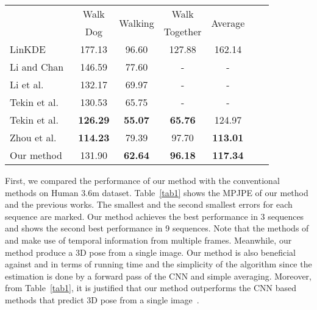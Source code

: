 \documentclass[runningheads]{llncs}
\begin{document}
\begin{table}[t]
\begin{tabular}{ l c c c c c c }
  \multirow{2}{*}{\quad} & Walk & \multirow{2}{*}{Walking} & Walk & \multirow{2}{*}{Average} \\
  & Dog & & Together & \\ \hline
  LinKDE~\cite{h36m_pami}\quad & 177.13 & 96.60 & 127.88 & 162.14 \\
  Li and Chan~\cite{li20143d}\quad & 146.59 & 77.60 & - & - \\
  Li et al.~\cite{li2015maximum}\quad & 132.17 & 69.97 & - & - \\
  Tekin et al.~\cite{tekin2016structured}\quad & 130.53 & 65.75 & - & - \\
  Tekin et al.~\cite{Tekin_2016_CVPR}\quad & \bf 126.29 & \bf 55.07 & \bf 65.76 & 124.97 \\
  Zhou et al.~\cite{Zhou_2016_CVPR}\quad & \bf 114.23 & 79.39 & 97.70 & \bf 113.01 \\
  Our method\quad & 131.90 & \bf 62.64 & \bf 96.18 & \bf 117.34 \\ \hline

\end{tabular}
\end{table}

First, we compared the performance of our method with the conventional methods on Human 3.6m dataset. Table~\ref{tab1} shows the MPJPE of our method and the previous works. The smallest and the second smallest errors for each sequence are marked. Our method achieves the best performance in 3 sequences and shows the second best performance in 9 sequences. Note that the methods of \cite{Tekin_2016_CVPR} and \cite{Zhou_2016_CVPR} make use of temporal information from multiple frames. Meanwhile, our method produce a 3D pose from a single image. Our method is also beneficial against \cite{Tekin_2016_CVPR} and \cite{Zhou_2016_CVPR} in terms of running time and the simplicity of the algorithm since the estimation is done by a forward pass of the CNN and simple averaging. Moreover, from Table~\ref{tab1}, it is justified that our method outperforms the CNN based methods that predict 3D pose from a single image~\cite{li20143d,li2015maximum,tekin2016structured}.
\end{document}
